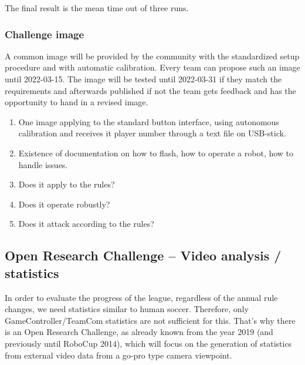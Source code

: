        The final result is the mean time out of three runs.

    \subsubsection{Challenge image}
        \label{sec:Challenge_image}
        A common image will be provided by the community with the standardized setup procedure and with automatic calibration. Every team can propose such an image until 2022-03-15. The image will be tested until 2022-03-31 if they match the requirements and afterwards published if not the team gets feedback and has the opportunity to hand in a revised image.

        \begin{enumerate}
            \item One image applying to the standard button interface, using autonomous calibration and receives it player number through a text file on USB-stick.
            \item Existence of documentation on how to flash, how to operate a robot, how to handle issues.
            \item Does it apply to the rules?
            \item Does it operate robustly?
            \item Does it attack according to the rules?
        \end{enumerate}

\newpage

\subsection{Open Research Challenge -- Video analysis / statistics}
In order to evaluate the progress of the league, regardless of the annual rule changes, we need statistics similar to human soccer. Therefore, only GameController/TeamCom statistics are not sufficient for this. That's why there is an Open Research Challenge, as already known from the year 2019 (and previously until RoboCup 2014), which will focus on the generation of statistics from external video data from a go-pro type camera viewpoint.

